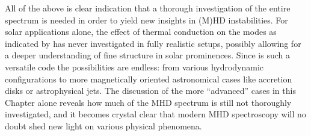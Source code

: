 All of the above is clear indication that a thorough investigation of the entire spectrum is needed in order to yield new insights in (M)HD instabilities. For solar applications alone, the effect of thermal conduction on the modes as indicated by \citet{vanderlinden1991} has never investigated in fully realistic setups, possibly allowing for a deeper understanding of fine structure in solar prominences. Since {\legolas} is such a versatile code the possibilities are endless: from various hydrodynamic configurations to more magnetically oriented astronomical cases like accretion disks or astrophysical jets. The discussion of the more ``advanced'' cases in this Chapter alone reveals how much of the MHD spectrum is still not thoroughly investigated, and it becomes crystal clear that modern MHD spectroscopy will no doubt shed new light on various physical phenomena.

\cleardoublepage
